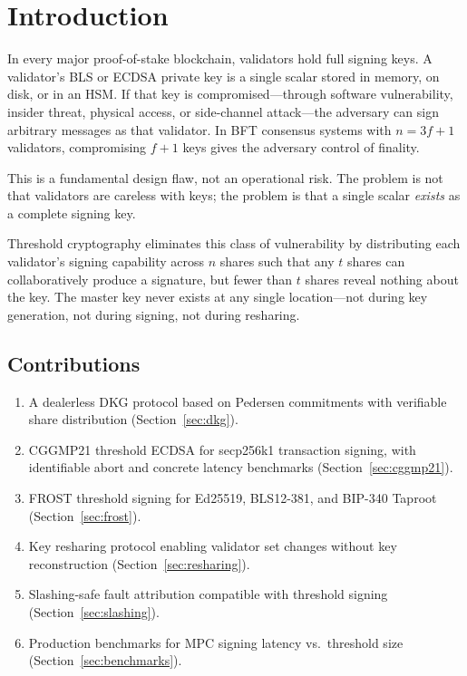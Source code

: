 \section{Introduction}

\label{sec:introduction}

In every major proof-of-stake blockchain, validators hold full signing keys. A
validator's BLS or ECDSA private key is a single scalar stored in memory, on disk,
or in an HSM. If that key is compromised---through software vulnerability, insider
threat, physical access, or side-channel attack---the adversary can sign arbitrary
messages as that validator. In BFT consensus systems with $n = 3f + 1$ validators,
compromising $f + 1$ keys gives the adversary control of finality.

This is a fundamental design flaw, not an operational risk. The problem is not that
validators are careless with keys; the problem is that a single scalar \emph{exists}
as a complete signing key.

Threshold cryptography eliminates this class of vulnerability by distributing each
validator's signing capability across $n$ shares such that any $t$ shares can
collaboratively produce a signature, but fewer than $t$ shares reveal nothing about
the key. The master key never exists at any single location---not during key
generation, not during signing, not during resharing.

\subsection{Contributions}

\begin{enumerate}[leftmargin=2em]
  \item A dealerless DKG protocol based on Pedersen commitments with verifiable
        share distribution (Section~\ref{sec:dkg}).
  \item CGGMP21 threshold ECDSA for secp256k1 transaction signing, with identifiable
        abort and concrete latency benchmarks (Section~\ref{sec:cggmp21}).
  \item FROST threshold signing for Ed25519, BLS12-381, and BIP-340 Taproot
        (Section~\ref{sec:frost}).
  \item Key resharing protocol enabling validator set changes without key
        reconstruction (Section~\ref{sec:resharing}).
  \item Slashing-safe fault attribution compatible with threshold signing
        (Section~\ref{sec:slashing}).
  \item Production benchmarks for MPC signing latency vs.\ threshold size
        (Section~\ref{sec:benchmarks}).
\end{enumerate}

